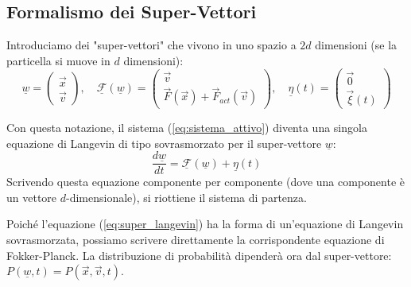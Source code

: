 \subsection{Formalismo dei Super-Vettori}
Introduciamo dei "super-vettori" che vivono in uno spazio a $2d$ dimensioni (se la particella si muove in $d$ dimensioni):
\begin{equation}
    \underline{w} = \begin{pmatrix} \vec{x} \\ \vec{v} \end{pmatrix}, \quad
    \underline{\mathcal{F}}(\underline{w}) = \begin{pmatrix} \vec{v} \\ \vec{F}(\vec{x}) + \vec{F}_{act}(\vec{v}) \end{pmatrix}, \quad
    \underline{\eta}(t) = \begin{pmatrix} \vec{0} \\ \vec{\xi}(t) \end{pmatrix}
\end{equation}


Con questa notazione, il sistema (\ref{eq:sistema_attivo}) diventa una singola equazione di Langevin di tipo sovrasmorzato per il super-vettore $\underline{w}$:
\begin{equation}
    \frac{d\underline{w}}{dt} = \underline{\mathcal{F}}(\underline{w}) + \underline{\eta}(t) \label{eq:super_langevin}
\end{equation}
Scrivendo questa equazione componente per componente (dove una componente è un vettore $d$-dimensionale), si riottiene il sistema di partenza.

Poiché l'equazione (\ref{eq:super_langevin}) ha la forma di un'equazione di Langevin sovrasmorzata, possiamo scrivere direttamente la corrispondente equazione di Fokker-Planck. La distribuzione di probabilità dipenderà ora dal super-vettore: $P(\underline{w}, t) = P(\vec{x}, \vec{v}, t)$.

